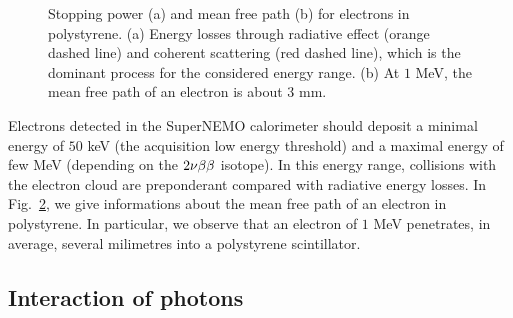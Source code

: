 \begin{figure}[h]
\begin{subfigure}[t]{0.48\textwidth}
    \captionsetup{justification=centering}
    \caption{\label{subfig:electron_free_path}}
  \end{subfigure}
  \caption{Stopping power (a) and mean free path (b) for electrons in polystyrene.
    (a) Energy losses through radiative effect (orange dashed line) and coherent scattering (red dashed line), which is the dominant process for the considered energy range.
    (b) At $1$ MeV, the mean free path of an electron is about $3$ mm.
  }
\end{figure}
Electrons detected in the SuperNEMO calorimeter should deposit a minimal energy of $50$ keV (the acquisition low energy threshold) and a maximal energy of few MeV (depending on the $2\nu\beta\beta$ isotope).
In this energy range, collisions with the electron cloud are preponderant compared with radiative energy losses.
In Fig.~\ref{subfig:electron_free_path}, we give informations about the mean free path of an electron in polystyrene.
In particular, we observe that an electron of $1$ MeV penetrates, in average, several milimetres into a polystyrene scintillator.


\subsection{Interaction of photons}

